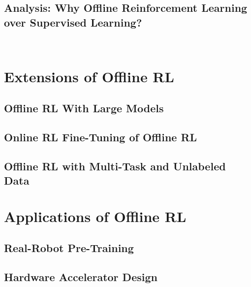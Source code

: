 \documentclass[letterpaper,12pt, oneside]{lib/ucthesis}
\begin{document}
\begin{dissertationText}
\chapter{Analysis: Why Offline Reinforcement Learning over Supervised Learning?}~\label{chapter:rl_vs_bc}
	

\part{Extensions of Offline RL}

\chapter{Offline RL With Large Models}
	

\chapter{Online RL Fine-Tuning of Offline RL}
	

\chapter{Offline RL with Multi-Task and Unlabeled Data}
	

\part{Applications of Offline RL}

\chapter{Real-Robot Pre-Training}
	

\chapter{Hardware Accelerator Design}
	

% 	

% 	


\end{dissertationText}
\end{document}
